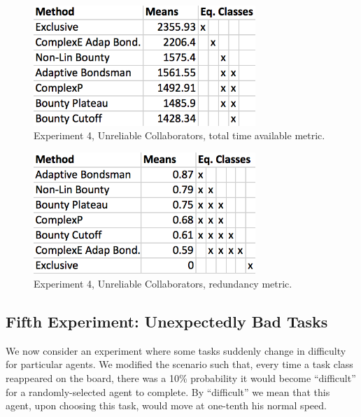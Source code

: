 \documentclass[letterpaper]{aamas2015}
\begin{document}
\begin{figure}[t]
\begin{center}\includegraphics[width=3.3in]{badT.png}\end{center}
\vspace{-0.5em}\caption{Experiment 4, Unreliable Collaborators, total time available metric.}
\label{badT}
\end{figure}

\begin{figure}[t]
\begin{center}\includegraphics[width=3.3in]{badR.png}\end{center}
\vspace{-0.5em}\caption{Experiment 4, Unreliable Collaborators, redundancy metric.}
\label{badR}
\end{figure}



\subsection{Fifth Experiment: Unexpectedly Bad Tasks}
We now consider an experiment where some tasks suddenly change in difficulty for particular agents. We modified the scenario such that, every time a task class reappeared on the board, there was a 10\% probability it would become ``difficult'' for a randomly-selected agent to complete.  By ``difficult'' we mean that this agent, upon choosing this task, would move at 
one-tenth his normal speed. %
\end{document}
